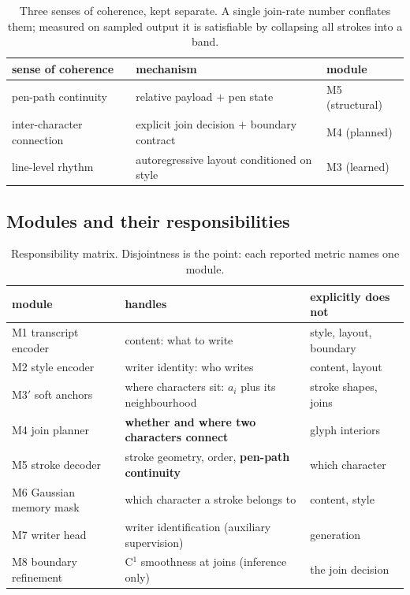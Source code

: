 \documentclass[conference]{IEEEtran}
\begin{document}
\begin{table}[t]
\centering\small
\begin{tabular}{@{}p{}p{}p{}@{}}
\toprule
sense of coherence & mechanism & module \\
\midrule
pen-path continuity & relative payload $+$ pen state & M5 (structural) \\
inter-character connection & explicit join decision $+$ boundary contract & M4 (planned) \\
line-level rhythm & autoregressive layout conditioned on style & M3 (learned) \\
\bottomrule
\end{tabular}
\caption{Three senses of coherence, kept separate. A single join-rate number conflates them;
measured on sampled output it is satisfiable by collapsing all strokes into a band.}
\label{tab:coherence}
\end{table}

\subsection{Modules and their responsibilities}
\begin{table}[t]
\centering\small
\begin{tabular}{@{}llp{}@{}}
\toprule
module & handles & explicitly does not \\
\midrule
M1 transcript encoder & content: what to write & style, layout, boundary \\
M2 style encoder & writer identity: who writes & content, layout \\
M3$'$ soft anchors & where characters sit: $a_i$ plus its neighbourhood & stroke shapes, joins \\
M4 join planner & \textbf{whether and where two characters connect} & glyph interiors \\
M5 stroke decoder & stroke geometry, order, \textbf{pen-path continuity} & which character \\
M6 Gaussian memory mask & which character a stroke belongs to & content, style \\
M7 writer head & writer identification (auxiliary supervision) & generation \\
M8 boundary refinement & C$^1$ smoothness at joins (inference only) & the join decision \\
\bottomrule
\end{tabular}
\caption{Responsibility matrix. Disjointness is the point: each reported metric names one module.}
\label{tab:modules}
\end{table}
\end{document}
